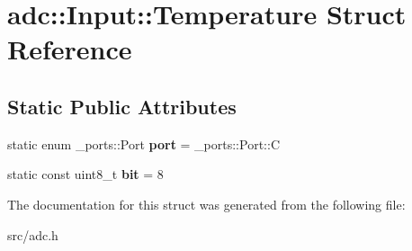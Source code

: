 \hypertarget{structadc_1_1Input_1_1Temperature}{}\section{adc\+:\+:Input\+:\+:Temperature Struct Reference}
\label{structadc_1_1Input_1_1Temperature}
\subsection*{Static Public Attributes}
\begin{DoxyCompactItemize}
\item 
static enum \+\_\+ports\+::\+Port {\bfseries port} = \+\_\+ports\+::\+Port\+::C\hypertarget{structadc_1_1Input_1_1Temperature_ace2a29165a12abbe19b62b02927003e9}{}\label{structadc_1_1Input_1_1Temperature_ace2a29165a12abbe19b62b02927003e9}

\item 
static const uint8\+\_\+t {\bfseries bit} = 8\hypertarget{structadc_1_1Input_1_1Temperature_aebcf8f7325e61063e68ffb71788054b9}{}\label{structadc_1_1Input_1_1Temperature_aebcf8f7325e61063e68ffb71788054b9}

\end{DoxyCompactItemize}


The documentation for this struct was generated from the following file\+:\begin{DoxyCompactItemize}
\item 
src/adc.\+h\end{DoxyCompactItemize}
